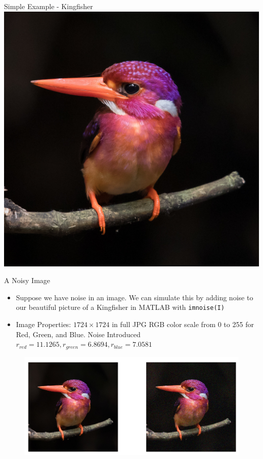 \documentclass[aspectratio=169,xcolor=dvipsnames]{beamer}
\begin{document}
	\begin{frame}{Simple Example - Kingfisher}
		\centering
		\includegraphics[scale=0.5]{Kingfisher.jpg}
	\end{frame}


	\begin{frame}[fragile]{A Noisy Image}
		\begin{itemize}
			\item Suppose we have noise in an image. We can simulate this by adding noise to our beautiful picture of a Kingfisher in MATLAB with \verb*|imnoise(I)|	
			\item Image Properties: $1724\times1724$ in full JPG RGB color scale from 0 to 255 for Red, Green, and Blue. Noise Introduced $r_{red} = 11.1265, r_{green} = 6.8694, r_{blue} = 7.0581$
		\end{itemize}
		\begin{figure}
			\centering
			\includegraphics[scale=0.35]{KingfisherWNoise.png}
		\end{figure}
	\end{frame}
	
\end{document}
